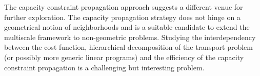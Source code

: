 \documentclass[twoside,11pt]{article}
\begin{document}
The capacity constraint propagation approach suggests a different venue for
further exploration. The capacity propagation strategy does not hinge on a
geometrical notion of neighborhoods and is a suitable candidate to extend the
multiscale framework to non-geometric problems. Studying the interdependency
between the cost function, hierarchical decomposition of the transport problem
(or possibly more generic linear programs) and the efficiency of the capacity
constraint propagation is a challenging but interesting problem.


%

\end{document}
